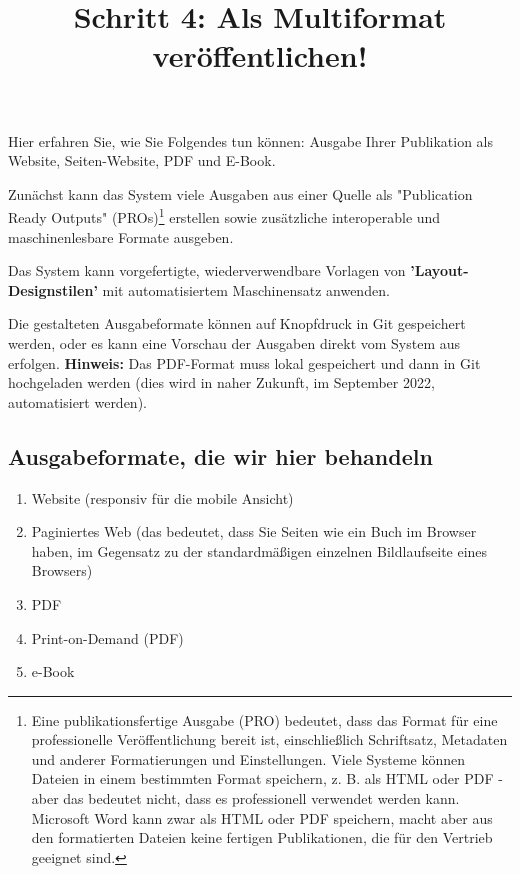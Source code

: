 \documentclass{article}
\begin{document}
\title{Schritt 4: Als Multiformat veröffentlichen!}

\maketitle


Hier erfahren Sie, wie Sie Folgendes tun können: Ausgabe Ihrer Publikation als Website, Seiten-Website, PDF und E-Book.


Zunächst kann das System viele Ausgaben aus einer Quelle als "Publication Ready Outputs" (PROs)\footnote{Eine publikationsfertige Ausgabe (PRO) bedeutet, dass das Format für eine professionelle Veröffentlichung bereit ist, einschließlich Schriftsatz, Metadaten und anderer Formatierungen und Einstellungen. Viele Systeme können Dateien in einem bestimmten Format speichern, z. B. als HTML oder PDF - aber das bedeutet nicht, dass es professionell verwendet werden kann. Microsoft Word kann zwar als HTML oder PDF speichern, macht aber aus den formatierten Dateien keine fertigen Publikationen, die für den Vertrieb geeignet sind.} erstellen sowie zusätzliche interoperable und maschinenlesbare Formate ausgeben.


Das System kann vorgefertigte, wiederverwendbare Vorlagen von \textbf{'Layout-Designstilen'} mit automatisiertem Maschinensatz anwenden.


Die gestalteten Ausgabeformate können auf Knopfdruck in Git gespeichert werden, oder es kann eine Vorschau der Ausgaben direkt vom System aus erfolgen. \textbf{Hinweis:} Das PDF-Format muss lokal gespeichert und dann in Git hochgeladen werden (dies wird in naher Zukunft, im September 2022, automatisiert werden).


\subsection{Ausgabeformate, die wir hier behandeln}\label{H9177340}


\begin{enumerate}
\item Website (responsiv für die mobile Ansicht)


\item Paginiertes Web (das bedeutet, dass Sie Seiten wie ein Buch im Browser haben, im Gegensatz zu der standardmäßigen einzelnen Bildlaufseite eines Browsers)


\item PDF


\item Print-on-Demand (PDF)


\item e-Book


\end{enumerate}
\end{document}
